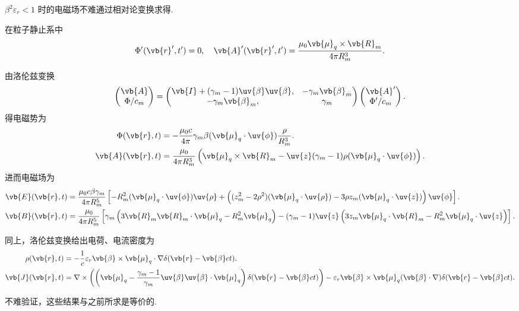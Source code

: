 \begin{notes}
	\(\beta^{2} \varepsilon_{r} < 1\) 时的电磁场不难通过相对论变换求得.

	在粒子静止系中
	\begin{equation*}
		\Phi'(\vb{r}', t') = 0, \quad
		\vb{A}'(\vb{r}', t') = \frac{\mu_{0} \vb{\mu}_{q} \times \vb{R}_{m}}{4\pi R_{m}^{3}}.
	\end{equation*}

	由洛伦兹变换
	\begin{equation*}
		\begin{pmatrix}
			\vb{A} \\
			\Phi/c_{m}
		\end{pmatrix} =
		\begin{pmatrix}
			\vb{I} + (\gamma_{m} - 1) \uv{\beta} \uv{\beta}, & -\gamma_{m} \vb{\beta}_{m} \\
			-\gamma_{m} \vb{\beta}_{m},                      & \gamma_{m}
		\end{pmatrix}
		\begin{pmatrix}
			\vb{A}' \\
			\Phi'/c_{m}
		\end{pmatrix}.
	\end{equation*}
	得电磁势为
	\begin{align*}
		\Phi(\vb{r}, t) &= -\frac{\mu_{0} c}{4\pi} \gamma_{m} \beta (\vb{\mu}_{q} \cdot \uv{\phi}) \frac{\rho}{R_{m}^{3}}. \\
		\vb{A}(\vb{r}, t) &= \frac{\mu_{0}}{4\pi R_{m}^{3}} \left( \vb{\mu}_{q} \times \vb{R}_{m} - \uv{z} (\gamma_{m} - 1) \rho (\vb{\mu}_{q} \cdot \uv{\phi}) \right).
	\end{align*}
	进而电磁场为
	\begin{align*}
		\vb{E}(\vb{r}, t) &= \frac{\mu_{0} c \beta \gamma_{m}}{4\pi R_{m}^{5}} \left[ -R_{m}^{2} (\vb{\mu}_{q} \cdot \uv{\phi}) \uv{\rho} + \left( (z_{m}^{2} - 2\rho^{2}) (\vb{\mu}_{q} \cdot \uv{\rho}) - 3 \rho z_{m} (\vb{\mu}_{q} \cdot \uv{z}) \right) \uv{\phi} \right]. \\
		\vb{B}(\vb{r}, t) &= \frac{\mu_{0}}{4\pi R_{m}^{5}} \left[ \gamma_{m} \left( 3 \vb{R}_{m} \vb{R}_{m} \cdot \vb{\mu}_{q} - R_{m}^{2} \vb{\mu}_{q} \right) - (\gamma_{m} - 1) \uv{z} \left( 3 z_{m} \vb{\mu}_{q} \cdot \vb{R}_{m} - R_{m}^{2} \vb{\mu}_{q} \cdot \uv{z} \right) \right].
	\end{align*}

	同上，洛伦兹变换给出电荷、电流密度为
	\begin{align*}
		\rho(\vb{r}, t) &= -\frac{1}{c} \varepsilon_{r} \vb{\beta} \times \vb{\mu}_{q} \cdot \nabla \delta(\vb{r} - \vb{\beta} c t). \\
		\vb{J}(\vb{r}, t) &= \nabla \times \left( \left( \vb{\mu}_{q} - \frac{\gamma_{m} - 1}{\gamma_{m}} \uv{\beta} \uv{\beta} \cdot \vb{\mu}_{q} \right) \delta(\vb{r} - \vb{\beta} c t) \right) - \varepsilon_{r} \vb{\beta} \times \vb{\mu}_{q} (\vb{\beta} \cdot \nabla) \delta(\vb{r} - \vb{\beta} c t).
	\end{align*}

	不难验证，这些结果与之前所求是等价的.

\end{notes}

